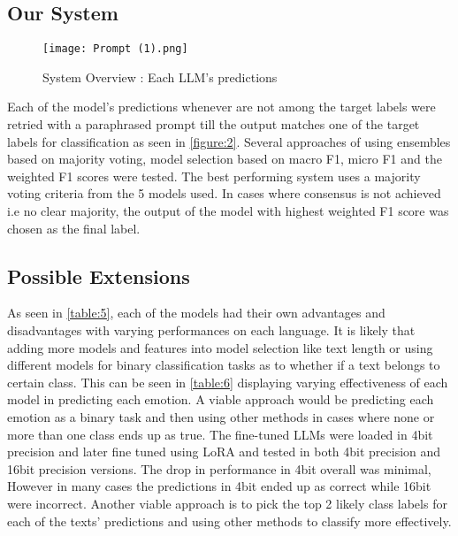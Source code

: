 \documentclass[11pt]{article}
\begin{document}

\subsection{Our System}
\begin{figure}[!ht]
    \centering
    \texttt{[image: Prompt (1).png]}
    \caption{System Overview : Each LLM's predictions}
    \label{figure:2}
\end{figure}
Each of the model's predictions whenever are not among the target labels were retried with a paraphrased prompt till the output matches one of the target labels for classification as seen in \autoref{figure:2}. Several approaches of using ensembles based on majority voting, model selection based on macro F1, micro F1 and the weighted F1 scores were tested. The best performing system uses a majority voting criteria from the 5 models used. In cases where consensus is not achieved i.e no clear majority, the output of the model with highest weighted F1 score was chosen as the final label.  


\subsection{Possible Extensions}
As seen in \autoref{table:5}, each of the models had their own advantages and disadvantages with varying performances on each language. It is likely that adding more models and features into model selection like text length or using different models for binary classification tasks as to whether if a text belongs to certain class. This can be seen in \autoref{table:6} displaying varying effectiveness of each model in predicting each emotion. A viable approach would be predicting each emotion as a binary task and then using other methods in cases where none or more than one class ends up as true. The fine-tuned LLMs were loaded in 4bit precision and later fine tuned using LoRA\citep{hu2021lowrank} and tested in both 4bit precision and 16bit precision versions. The drop in performance in 4bit overall was minimal, However in many cases the predictions in 4bit ended up as correct while 16bit were incorrect. Another viable approach is to pick the top 2 likely class labels for each of the texts' predictions and using other methods to classify more effectively.
\end{document}
